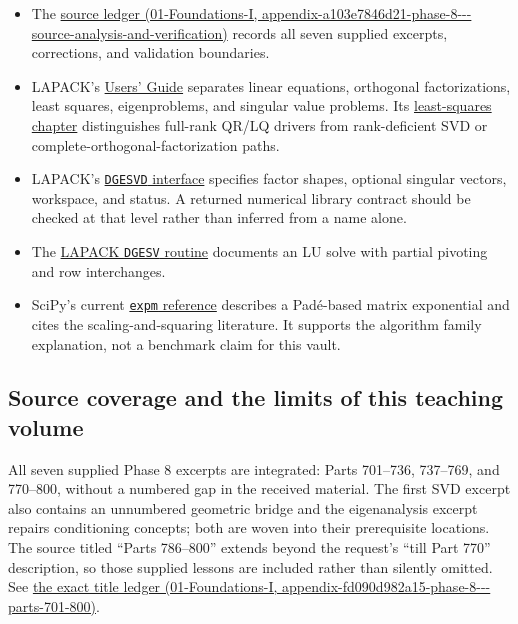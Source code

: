 \begin{itemize}
\tightlist
\item
  The \href{../01-Foundations-I/main.pdf\#nameddest=appendix-a103e7846d21-phase-8---source-analysis-and-verification}{source ledger (01-Foundations-I, appendix-a103e7846d21-phase-8-\/-\/-source-analysis-and-verification)} records all seven supplied excerpts, corrections, and validation boundaries.
\item
  LAPACK's \href{https://netlib.org/lapack/lug/index.html}{Users' Guide} separates linear equations, orthogonal factorizations, least squares, eigenproblems, and singular value problems. Its \href{https://www.netlib.org/lapack/lug/node27.html}{least-squares chapter} distinguishes full-rank QR/LQ drivers from rank-deficient SVD or complete-orthogonal-factorization paths.
\item
  LAPACK's \href{https://netlib.org/lapack/explore-html/d1/d7f/group__gesvd_gac6bd5d4e645049e49bb70691180abf07.html}{\texttt{DGESVD} interface} specifies factor shapes, optional singular vectors, workspace, and status. A returned numerical library contract should be checked at that level rather than inferred from a name alone.
\item
  The \href{https://netlib.org/lapack/explore-html/d8/da6/group__gesv_ga831ce6a40e7fd16295752d18aed2d541.html}{LAPACK \texttt{DGESV} routine} documents an LU solve with partial pivoting and row interchanges.
\item
  SciPy's current \href{https://docs.scipy.org/doc/scipy/reference/generated/scipy.sparse.linalg.expm.html}{\texttt{expm} reference} describes a Padé-based matrix exponential and cites the scaling-and-squaring literature. It supports the algorithm family explanation, not a benchmark claim for this vault.
\end{itemize}

\subsection{Source coverage and the limits of this teaching volume}\label{02-foundations-ii-ch039-source-coverage-and-the-limits-of-this-teaching-volume}

All seven supplied Phase 8 excerpts are integrated: Parts 701--736, 737--769, and 770--800, without a numbered gap in the received material. The first SVD excerpt also contains an unnumbered geometric bridge and the eigenanalysis excerpt repairs conditioning concepts; both are woven into their prerequisite locations. The source titled ``Parts 786--800'' extends beyond the request's ``till Part 770'' description, so those supplied lessons are included rather than silently omitted. See \href{../01-Foundations-I/main.pdf\#nameddest=appendix-fd090d982a15-phase-8---parts-701-800}{the exact title ledger (01-Foundations-I, appendix-fd090d982a15-phase-8-\/-\/-parts-701-800)}.

